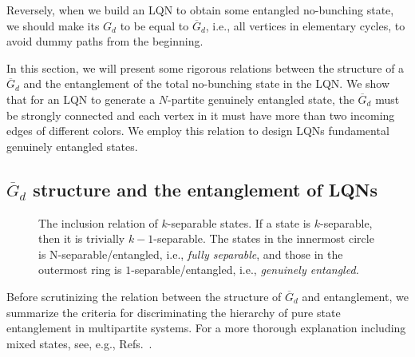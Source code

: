 \documentclass[a4paper,twocolumn,8pt,accepted=2021-12-15]{quantumarticle}
\def\dc{{\overline{G}_d }}
\begin{document}
	Reversely, when we build an LQN to obtain some entangled no-bunching state, we should make its $G_d$ to be equal to $\dc$, i.e., all vertices in elementary cycles, to avoid dummy paths from the beginning.	
	
	In this section, we will present some rigorous relations between the structure of a $\dc$ and the entanglement of the total no-bunching state in the LQN. We show that for an LQN to generate a $N$-partite genuinely entangled state, the $\dc$ must be strongly connected and each vertex in it must have more than two incoming edges of different colors. We employ this relation to design LQNs fundamental genuinely entangled states. 
	
	
	\subsection{$\dc$ structure and the entanglement of LQNs}	\label{pmdiagram_entanglement}
	
	
	\begin{figure}
		\centering 	
		\caption{The inclusion relation of $k$-separable states. If a state is $k$-separable, then it is trivially $k-1$-separable. The states in the innermost circle is N-separable/entangled, i.e., \emph{fully separable}, and those in the outermost ring is $1$-separable/entangled, i.e., \emph{genuinely entangled.}
		}
		\label{ksep}
	\end{figure}
	
	Before scrutinizing the relation between the structure of $\dc$ and entanglement, we summarize the criteria for discriminating the hierarchy of pure state entanglement in multipartite systems. For a more thorough explanation including mixed states, see, e.g., Refs.~\cite{seevinck2008partial,szalay2012partial}.
	
\end{document}
